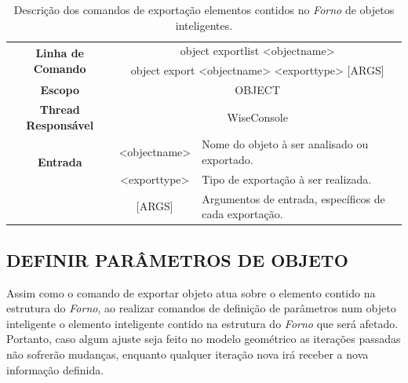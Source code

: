 \documentclass[a4paper,12pt]{monografia}
\theoremstyle{plain}
\theoremstyle{definition}
\theoremstyle{remark}
\begin{document}
\begin{center}
	\begin{table}[!htbp]
		\begin{tabular}{|c|c|m{}|}
			\hline
			\multirow{2}{*}{\textbf{Linha de Comando}} & \multicolumn{2}{c|}{object export\underline{\space\space}list <object\underline{\space\space}name>} \\
			 & \multicolumn{2}{c|}{object export <object\underline{\space\space}name> <export\underline{\space\space}type> [ARGS]} \\
			\hline
			\textbf{Escopo} & \multicolumn{2}{c|}{OBJECT} \\
			\hline
			\textbf{Thread Responsável} & \multicolumn{2}{c|}{WiseConsole} \\
			\hline
			\multirow{2}{*}{\textbf{Entrada}} &  <object\underline{\space\space}name> & Nome do objeto à ser analisado ou exportado. \\
			&  <export\underline{\space\space}type> & Tipo de exportação à ser realizada. \\
			&  [ARGS] & Argumentos de entrada, específicos de cada exportação. \\
			\hline
		\end{tabular}
		\caption{Descrição dos comandos de exportação elementos contidos no \textit{Forno} de objetos inteligentes.}
		\label{tab:export_object}
	\end{table}
\end{center}

\subsection{DEFINIR PARÂMETROS DE OBJETO}\label{sec:set_field_object}

Assim como o comando de exportar objeto atua sobre o elemento contido na estrutura do \textit{Forno}, ao realizar comandos de definição de parâmetros num objeto inteligente o elemento inteligente contido na estrutura do \textit{Forno} que será afetado. Portanto, caso algum ajuste seja feito no modelo geométrico as iterações passadas não sofrerão mudanças, enquanto qualquer iteração nova irá receber a nova informação definida.
\end{document}
